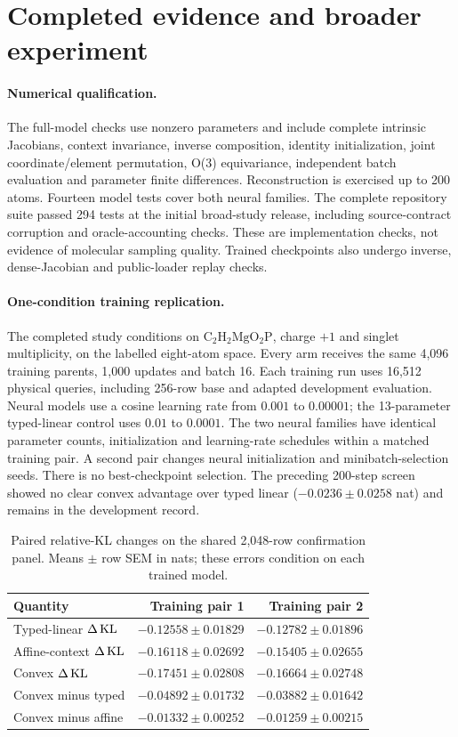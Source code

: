 \section{Completed evidence and broader experiment}
\paragraph{Numerical qualification.}
The full-model checks use nonzero parameters and include complete intrinsic
Jacobians, context invariance, inverse composition, identity initialization,
joint coordinate/element permutation, O(3) equivariance, independent batch
evaluation and parameter finite differences. Reconstruction is exercised up
to 200 atoms. Fourteen model tests cover both neural families. The complete
repository suite passed 294 tests at the initial broad-study release, including source-contract corruption
and oracle-accounting checks. These are implementation checks, not evidence
of molecular sampling quality. Trained checkpoints also undergo inverse,
dense-Jacobian and public-loader replay checks.

\paragraph{One-condition training replication.}
The completed study conditions on $\mathrm{C_2H_2MgO_2P}$, charge $+1$ and
singlet multiplicity, on the labelled eight-atom space. Every arm receives
the same 4,096 training parents, 1,000 updates and batch 16. Each training run
uses 16,512 physical queries, including 256-row base and adapted development
evaluation. Neural models use a cosine learning rate from $0.001$ to $0.00001$;
the 13-parameter typed-linear control uses $0.01$ to $0.0001$.
The two neural families have identical parameter counts, initialization and
learning-rate schedules within a matched training pair. A second pair changes
neural initialization and minibatch-selection seeds. There is no best-checkpoint
selection. The preceding 200-step screen showed no clear convex advantage over
typed linear ($-0.0236\pm0.0258$ nat) and remains in the development record.

\begin{table}[t]
\centering
\caption{Paired relative-KL changes on the shared 2,048-row confirmation panel.
Means $\pm$ row SEM in nats; these errors condition on each trained model.}
\label{tab:refinement-results}
\begin{tabular}{lrr}
\toprule
Quantity & Training pair 1 & Training pair 2\\
\midrule
Typed-linear $\Delta\operatorname{KL}$ & $-0.12558\pm0.01829$ & $-0.12782\pm0.01896$\\
Affine-context $\Delta\operatorname{KL}$ & $-0.16118\pm0.02692$ & $-0.15405\pm0.02655$\\
Convex $\Delta\operatorname{KL}$ & $-0.17451\pm0.02808$ & $-0.16664\pm0.02748$\\
Convex minus typed & $-0.04892\pm0.01732$ & $-0.03882\pm0.01642$\\
Convex minus affine & $-0.01332\pm0.00252$ & $-0.01259\pm0.00215$\\
\bottomrule
\end{tabular}
\end{table}

